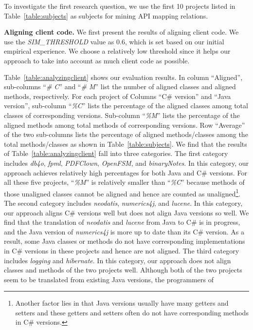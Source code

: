 To investigate the first research question, we use the first 10 projects
listed in Table~\ref{table:subjects} as subjects for mining API mapping relations.

\textbf{Aligning client code.}
We first present the results of aligning client code.
We use the \emph{SIM\_THRESHOLD} value as 0.6, which is set based on our initial
empirical experience. We choose a relatively low threshold since it helps our
approach to take into account as much client code as possible.

Table~\ref{table:analyzingclient} shows our evaluation results.
In column ``Aligned'', sub-columns ``\emph{\# C}'' and
``\emph{\# M}'' list the number of aligned classes and aligned methods, respectively.
For each project of Columns ``C\# version'' and ``Java version'', sub-column ``\emph{\%C}'' lists the
percentage of the aligned classes among total classes of
corresponding versions. Sub-column ``\emph{\%M}'' lists the
percentage of the aligned methods among total methods of
corresponding versions. Row ``Average'' of the two sub-columns lists
the percentage of aligned methods/classes among the total
methods/classes as shown in Table~\ref{table:subjects}. We find that
the results of Table~\ref{table:analyzingclient} fall into three
categories. The first category includes \emph{db4o}, \emph{fpml},
\emph{PDFClown}, \emph{OpenFSM}, and \emph{binaryNotes}. In this category, our
approach achieves relatively high percentages for both Java
and C\# versions. For all these five projects, ``\emph{\%M}'' is
relatively smaller than ``\emph{\%C}'' because methods of those
unaligned classes cannot be aligned and hence are counted as
unaligned\footnote{Another factor lies in that Java versions usually
have many getters and setters and these getters and setters often do
not have corresponding methods in C\# versions.}. The second
category includes \emph{neodatis}, \emph{numerics4j}, and
\emph{lucene}. In this category, our approach aligns C\# versions well but does
not align Java versions so well. We find that the translation of \emph{neodatis} and
\emph{lucene} from Java to C\# is in progress, and the
Java version of \emph{numerics4j} is more up to date than its
C\# version. As a result, some Java classes or methods do not have
corresponding implementations in C\# versions in these projects and
hence are not aligned. The third category includes \emph{logging}
and \emph{hibernate}. In this category, our approach does not align classes and
methods of the two projects well. Although both of the two projects
seem to be translated from existing Java versions, the programmers of
